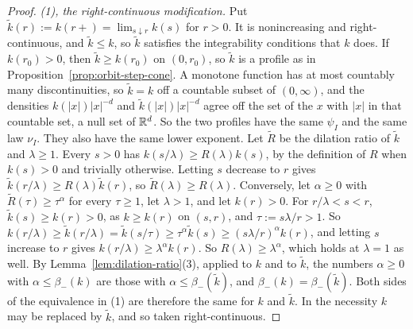 \begin{proof}
\emph{(1), the right-continuous modification.} Put $\tilde k(r) := k(r{+}) = \lim_{s \downarrow r}k(s)$ for $r > 0$.
It is nonincreasing and right-continuous, and $\tilde k \le k$, so $\tilde k$ satisfies the
integrability conditions that $k$ does. If $k(r_0) > 0$, then $\tilde k \ge k(r_0)$ on
$(0, r_0)$, so $\tilde k$ is a profile as in Proposition~\ref{prop:orbit-step-cone}. A monotone function has at most
countably many discontinuities, so $\tilde k = k$ off a countable subset of $(0, \infty)$, and the densities
$k(|x|)|x|^{-d}$ and $\tilde k(|x|)|x|^{-d}$ agree off the set of the $x$ with $|x|$ in that countable set,
a null set of $\mathbb{R}^d$. So the two profiles have the same
$\psi_I$ and the same law $\nu_I$. They also have the same lower exponent. Let $\tilde R$ be the dilation ratio of
$\tilde k$ and $\lambda \ge 1$. Every $s > 0$ has $k(s/\lambda) \ge R(\lambda)k(s)$, by the definition of $R$ when
$k(s) > 0$ and trivially otherwise. Letting $s$ decrease to $r$ gives $\tilde k(r/\lambda) \ge R(\lambda)\tilde k(r)$,
so $\tilde R(\lambda) \ge R(\lambda)$. Conversely, let $\alpha \ge 0$ with $\tilde R(\tau) \ge \tau^\alpha$ for every
$\tau \ge 1$, let $\lambda > 1$, and let $k(r) > 0$. For $r/\lambda < s < r$, $\tilde k(s) \ge k(r) > 0$, as
$k \ge k(r)$ on $(s, r)$, and $\tau := s\lambda/r > 1$. So
$k(r/\lambda) \ge \tilde k(r/\lambda) = \tilde k(s/\tau) \ge \tau^\alpha\tilde k(s) \ge (s\lambda/r)^\alpha k(r)$, and
letting $s$ increase to $r$ gives $k(r/\lambda) \ge \lambda^\alpha k(r)$. So $R(\lambda) \ge \lambda^\alpha$, which
holds at $\lambda = 1$ as well. By Lemma~\ref{lem:dilation-ratio}(3), applied to $k$ and to $\tilde k$, the numbers
$\alpha \ge 0$ with $\alpha \le \beta_-(k)$ are those with $\alpha \le \beta_-(\tilde k)$, and
$\beta_-(k) = \beta_-(\tilde k)$. Both sides of the equivalence in (1) are therefore the same for $k$ and $\tilde k$.
In the necessity $k$ may be replaced by $\tilde k$, and so taken right-continuous.


\end{proof}
